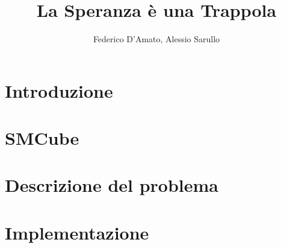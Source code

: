 \documentclass{article}
\title{La Speranza è una Trappola}
\author{Federico D'Amato, Alessio Sarullo}
\begin{document}
\maketitle


\section{Introduzione}

\section{SMCube}

\section{Descrizione del problema}

\section{Implementazione}




\newpage
\nocite{*}		 %
{}

\end{document}
